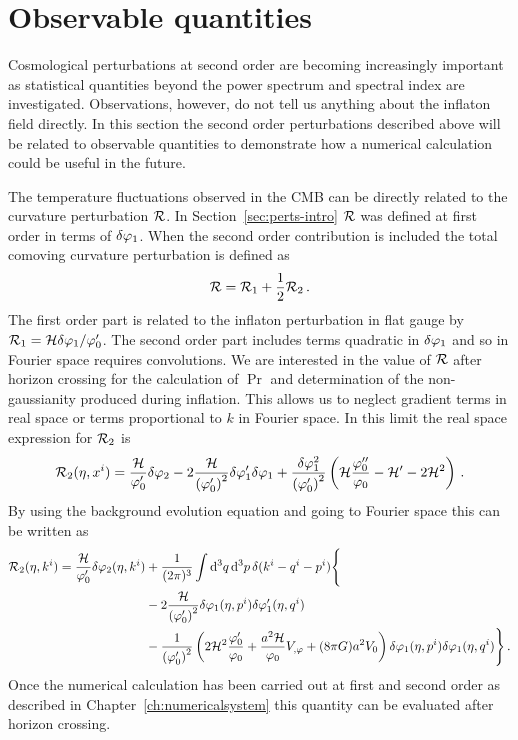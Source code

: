 \section{Observable quantities}
\label{sec:observable-perts}

Cosmological perturbations at second order are becoming increasingly important as
statistical quantities beyond the power spectrum and spectral index are
investigated. Observations, however, do not tell us anything about the inflaton
field directly. In this section the second order perturbations described above will
be related to observable quantities to demonstrate how a numerical calculation could
be useful in the future.
% 

The temperature fluctuations observed in the CMB can
be directly related to the curvature perturbation $\mathcal{R}$. In
Section~\ref{sec:perts-intro} $\mathcal{R}$ was defined at first order in terms of $\delta\varphi_{1}$.
When the second order contribution is included the total comoving curvature
perturbation is defined as
% 
\begin{equation}
\label{eq:Rfulldefn-perts}
 \mathcal{R} = \mathcal{R}_1 + \frac{1}{2}\mathcal{R}_2\,.
\end{equation}
% 
The first order part is related to the inflaton perturbation in flat gauge by $\mathcal{R}_1
= \mathcal{H}\delta\varphi_{1}/\varphi_0'$. The second order part includes terms quadratic in $\delta\varphi_{1}$ and so
in Fourier space requires convolutions. We are interested in the value of $\mathcal{R}$ after
horizon crossing for the calculation of $\Pr$ and determination of the
non-gaussianity produced during inflation. This allows us to neglect gradient terms
in real space or terms proportional to $k$ in Fourier space.
In this limit the real space expression for $\mathcal{R}_2$ is \cite{Malik:2005cy}
% 
\begin{equation}
 \label{eq:R2real-perts}
\mathcal{R}_2(\eta, x^i) = \frac{\mathcal{H}}{\varphi_0'}\delta\varphi_{2} - 2\frac{\mathcal{H}}{\left(\varphi_0'\right)^2}
\delta\varphi_{1}'\delta\varphi_{1} + \frac{\delta\varphi_{1}^2}{\left(\varphi_0'\right)^2}\left(\mathcal{H}\frac{\varphi_0''}{\varphi_0} 
 - \mathcal{H}' -2\mathcal{H}^2 \right)\,.
\end{equation}
% 
By using the background evolution equation  and going to Fourier
space this can be written as
% 
\begin{align}
 \R_2(\eta, \kvi) = \frac{\H}{\vp_0'}\dvp2(\eta, \kvi) 
  &+ \frac{1}{(2\pi)^3}\int \d^3q\, \d^3p\, \delta(\kvi-\qvi-\pvi) \Bigg\{
\nonumber\\
% 
 &-2\frac{\H}{\left(\vp_0'\right)^2} \dvp1(\eta, \pvi)\dvp1'(\eta, \qvi) \nonumber\\
%  
&-\frac{1}{\left(\vp_0'\right)^2} \left(
  2\H^2 \frac{\vp_0'}{\vp_0} + \frac{a^2 \H}{\vp_0}\Uphi + (8\pi G)a^2 \U
 \right)
\dvp1(\eta,\pvi) \dvp1(\eta, \qvi)\Bigg\}\,.
\end{align}
% 
Once the numerical calculation has been carried out at first and second order as
described in Chapter~\ref{ch:numericalsystem} this quantity can be evaluated after
horizon crossing.

